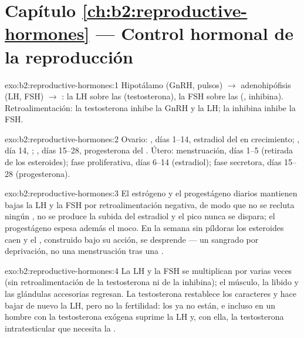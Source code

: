 \section*{Capítulo \ref{ch:b2:reproductive-hormones} --- Control hormonal de la reproducción}

\begin{solution}{exo:b2:reproductive-hormones:1}
Hipotálamo (GnRH, pulsos) $\to$ adenohipófisis (LH, FSH) $\to$
: la LH sobre las  (testosterona), la FSH sobre
las  (, inhibina). Retroalimentación: la
testosterona inhibe la GnRH y la LH; la inhibina inhibe la FSH.
\end{solution}

\begin{solution}{exo:b2:reproductive-hormones:2}
Ovario: , días 1--14, estradiol del  en
crecimiento; , día 14, ; , días 15--28,
progesterona del . Útero: menstruación, días 1--5 (retirada
de los esteroides); fase proliferativa, días 6--14 (estradiol); fase
secretora, días 15--28 (progesterona).
\end{solution}

\begin{solution}{exo:b2:reproductive-hormones:3}
El estrógeno y el progestágeno diarios mantienen bajas la LH y la FSH por
retroalimentación negativa, de modo que no se recluta ningún , no
se produce la subida del estradiol y el pico nunca se dispara; el
progestágeno espesa además el moco. En la semana sin píldoras los
esteroides caen y el , construido bajo su acción, se desprende
--- un sangrado por deprivación, no una menstruación tras una .
\end{solution}

\begin{solution}{exo:b2:reproductive-hormones:4}
La LH y la FSH se multiplican por varias veces (sin retroalimentación de
la testosterona ni de la inhibina); el músculo, la libido y las glándulas
accesorias regresan. La testosterona restablece los caracteres y hace
bajar de nuevo la LH, pero no la fertilidad: los  ya no están,
e incluso en un hombre con  la testosterona exógena suprime la
LH y, con ella, la testosterona intratesticular que necesita la
.
\end{solution}


